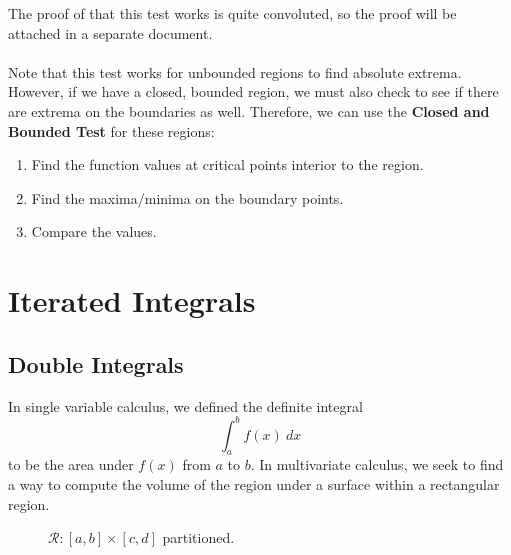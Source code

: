 \documentclass[12pt]{article}
\begin{document}
The proof of that this test works is quite convoluted, so the proof will be attached in a separate document.  \\ \\
Note that this test works for unbounded regions to find absolute extrema. However, if we have a closed, bounded region, we must also check to see if there are extrema on the boundaries as well. Therefore, we can use the \textbf{Closed and Bounded Test} for these regions:
\begin{enumerate}
\item Find the function values at critical points interior to the region.
\item Find the maxima/minima on the boundary points.
\item Compare the values.
\end{enumerate}

\section{Iterated Integrals}

\subsection{Double Integrals}
In single variable calculus, we defined the definite integral \[ \int_a^b f(x) \ dx \] to be the area under $f(x)$ from $a$ to $b$. In multivariate calculus, we seek to find a way to compute the volume of the region under a surface within a rectangular region. 

\begin{figure}[h!]
\centering
{}
\caption{$\mathcal{R}: [a,b] \times [c,d]$ partitioned.}
\end{figure}
\end{document}

